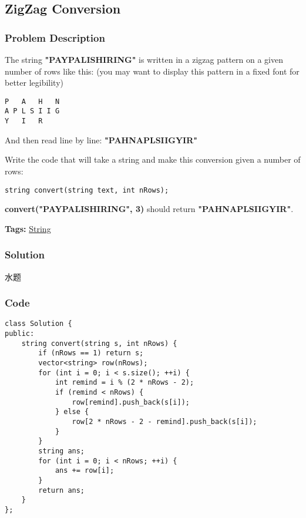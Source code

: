 \documentclass{article}
\begin{document}
\begin{CJK*}{UTF8}{gkai}
\subsection{ ZigZag Conversion }
\label{ ZigZag Conversion }

\subsubsection*{Problem Description}
The string \textbf{"PAYPALISHIRING"} is written in a zigzag pattern on a given number of rows like this: (you may want to display this pattern in a fixed font for better legibility)
\begin{verbatim}
P   A   H   N
A P L S I I G
Y   I   R
\end{verbatim}

And then read line by line: \textbf{"PAHNAPLSIIGYIR"}

Write the code that will take a string and make this conversion given a number of rows:

\begin{verbatim}string convert(string text, int nRows);\end{verbatim}

\textbf{convert("PAYPALISHIRING", 3)} should return \textbf{"PAHNAPLSIIGYIR"}.


\textbf{Tags: }
\hyperref[ String ]{ String }



\subsubsection*{Solution}
水题

\subsubsection*{Code}
\begin{lstlisting}
class Solution {
public:
    string convert(string s, int nRows) {
        if (nRows == 1) return s;
        vector<string> row(nRows);
        for (int i = 0; i < s.size(); ++i) {
            int remind = i % (2 * nRows - 2);
            if (remind < nRows) {
                row[remind].push_back(s[i]);
            } else {
                row[2 * nRows - 2 - remind].push_back(s[i]);
            }
        }
        string ans;
        for (int i = 0; i < nRows; ++i) {
            ans += row[i];
        }
        return ans;
    }
};

\end{lstlisting}


\end{CJK*}
\end{document}
